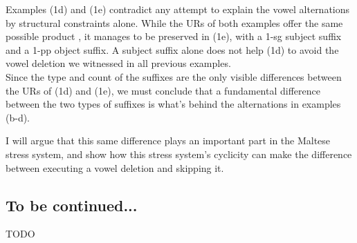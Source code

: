 \documentclass[11pt,draft]{article}
\begin{document}
Examples (1d) and (1e) contradict any attempt to explain the vowel alternations by structural constraints alone. While the URs of both examples offer the same possible product \textipa{[h5.t5f.n5]}, it manages to be preserved in (1e), with a 1-sg subject suffix and a 1-pp object suffix. A subject suffix alone does not help (1d) to avoid the vowel deletion we witnessed in all previous examples.
\\

Since the type and count of the suffixes are the only visible differences between the URs of (1d) and (1e), we must conclude that a fundamental difference between the two types of suffixes is what's behind the alternations in examples (b-d).

I will argue that this same difference plays an important part in the Maltese stress system, and show how this stress system's cyclicity can make the difference between executing a vowel deletion and skipping it.

\subsection{To be continued...}

TODO





%
%
%	
%




\end{document}
